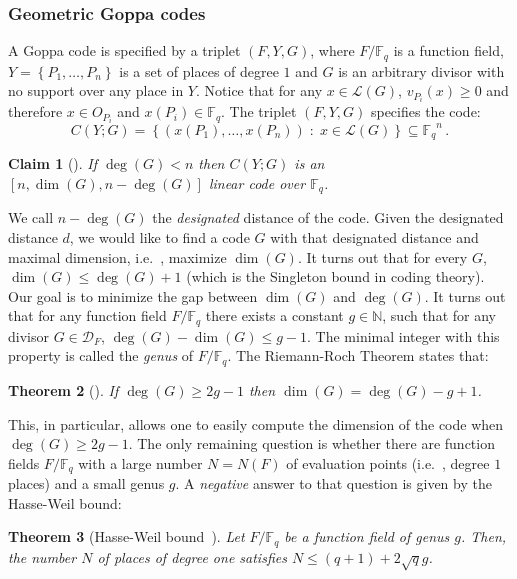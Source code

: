 \documentclass[10pt]{article}
\newtheorem{theorem}{Theorem}[section]
\newtheorem{claim}[theorem]{Claim}
\theoremstyle{definition}
\providecommand{\ie}{i.e.\ }
\numberwithin{equation}{section}
\newcommand{\cD}{\mathcal{D}}
\newcommand{\Fq}{{\mathbb{F}_q}}
\newcommand{\cL}{\mathcal{L}}
\newcommand{\set}[1]{{\left\{#1\right\}}}
\newcommand{\Pl}{{Y}}
\begin{document}
\subsubsection{Geometric Goppa codes}\label{subsec:GoppaCodes}
A Goppa code is specified by a triplet $(F,\Pl,G)$, where $F/\Fq$
is a function field, $\Pl = \set{P_1,\ldots,P_n}$ is a set of
places of degree $1$ and $G$ is an arbitrary divisor with no
support over any place in $\Pl$. Notice that for any $x \in
\cL(G)$, $v_{P_i}(x) \ge 0$ and therefore $x \in O_{P_i}$ and $x
(P_i) \in \Fq $. The triplet $(F,\Pl,G)$ specifies the code:
$$C(\Pl;G)=\set{(x(P_1),\ldots,x(P_n)) \;:\; x \in \cL(G)} \subseteq \Fq ^n\,.$$

\begin{claim}[{\cite[Cor II.2.3]{S:93}}]\label{clm-goppa-code}
If $\deg(G) < n$ then $C(\Pl;G)$ is an $[n,\dim(G),n-\deg(G)]$
linear code over $\Fq $.
\end{claim}


We call $n-\deg(G)$ the \emph{designated} distance of the code.
Given the designated distance $d$, we would like to find a code $G$
with that designated distance and maximal dimension, \ie, maximize
$\dim(G)$. It turns out that for every $G$, $\dim(G) \le \deg(G)+1$
(which is the Singleton bound in coding theory). Our goal is to
minimize the gap between $\dim(G)$ and $\deg(G)$. It turns out that
for any function field $F/\Fq$ there exists a constant $g \in
\mathbb{N}$, such that for any divisor $G \in \cD_F$, $\deg(G) -
\dim(G) \le g-1$. The minimal integer with this property is called
the \emph{genus} of $F/\Fq $. The Riemann-Roch Theorem states that:

\begin{theorem}[{\cite[Thm I.5.17]{S:93}}] If $\deg(G) \ge 2g-1$ then
$\dim(G)=\deg(G)-g+1$.
\end{theorem}

This, in particular, allows one to easily compute the dimension of
the code when $\deg(G) \ge 2g-1$. The only remaining question is
whether there are function fields $F/\Fq$ with a large number
$N=N(F)$ of evaluation points (\ie, degree $1$ places) and a small
genus $g$. A \emph{negative} answer to that question is given by the Hasse-Weil bound:
\begin{theorem}[{Hasse-Weil bound~\cite[Thm V.2.3]{S:93}}]
 \label{thm:hasse-weil}
Let $F/\Fq$ be a function field of genus $g$. Then, the number $N$ of places of degree one satisfies $N \le (q+1)+2\sqrt{q}g$.
\end{theorem}
\end{document}
